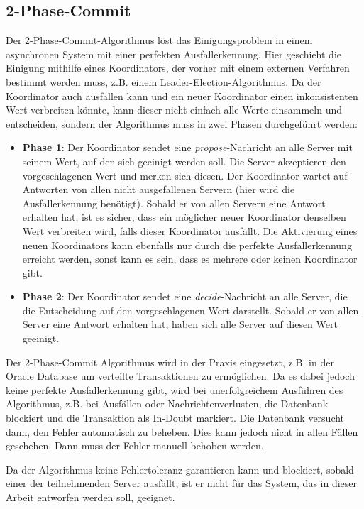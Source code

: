 \subsection{2-Phase-Commit}

Der 2-Phase-Commit-Algorithmus löst das Einigungsproblem in einem asynchronen System mit einer perfekten Ausfallerkennung. Hier geschieht die Einigung mithilfe eines Koordinators, der vorher mit einem externen Verfahren bestimmt werden muss, z.B. einem Leader-Election-Algorithmus. Da der Koordinator auch ausfallen kann und ein neuer Koordinator einen inkonsistenten Wert verbreiten könnte, kann dieser nicht einfach alle Werte einsammeln und entscheiden, sondern der Algorithmus muss in zwei Phasen durchgeführt werden:

\begin{itemize}
	\item \textbf{Phase 1}: Der Koordinator sendet eine \textit{propose}-Nachricht an alle Server mit seinem Wert, auf den sich geeinigt werden soll. Die Server akzeptieren den vorgeschlagenen Wert und merken sich diesen. Der Koordinator wartet auf Antworten von allen nicht ausgefallenen Servern (hier wird die Ausfallerkennung benötigt). Sobald er von allen Servern eine Antwort erhalten hat, ist es sicher, dass ein möglicher neuer Koordinator denselben Wert verbreiten wird, falls dieser Koordinator ausfällt. Die Aktivierung eines neuen Koordinators kann ebenfalls nur durch die perfekte Ausfallerkennung erreicht werden, sonst kann es sein, dass es mehrere oder keinen Koordinator gibt.
	\item \textbf{Phase 2}: Der Koordinator sendet eine \textit{decide}-Nachricht an alle Server, die die Entscheidung auf den vorgeschlagenen Wert darstellt. Sobald er von allen Server eine Antwort erhalten hat, haben sich alle Server auf diesen Wert geeinigt.
\end{itemize}

Der 2-Phase-Commit Algorithmus wird in der Praxis eingesetzt, z.B. in der Oracle Database \cite{oracle-db-2pc} um verteilte Transaktionen zu ermöglichen. Da es dabei jedoch keine perfekte Ausfallerkennung gibt, wird bei unerfolgreichem Ausführen des Algorithmus, z.B. bei Ausfällen oder Nachrichtenverlusten, die Datenbank blockiert und die Transaktion als \glqq In-Doubt\grqq{} markiert. Die Datenbank versucht dann, den Fehler automatisch zu beheben. Dies kann jedoch nicht in allen Fällen geschehen. Dann muss der Fehler manuell behoben werden.

Da der Algorithmus keine Fehlertoleranz garantieren kann und blockiert, sobald einer der teilnehmenden Server ausfällt, ist er nicht für das System, das in dieser Arbeit entworfen werden soll, geeignet. 

